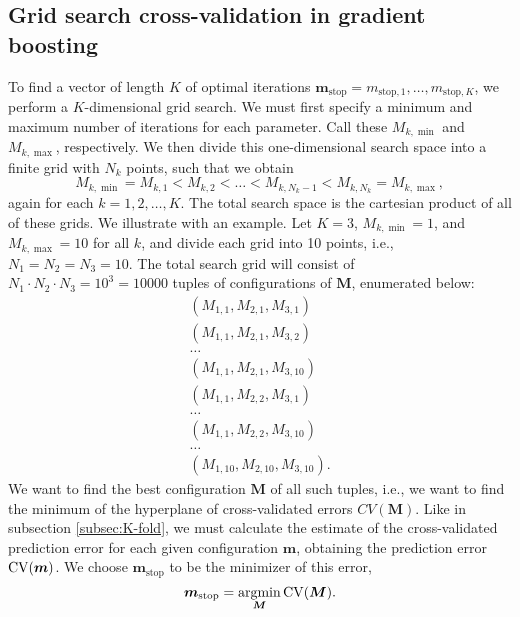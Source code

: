 \subsection{Grid search cross-validation in gradient boosting}\label{grid-search}
To find a vector of length $K$ of optimal iterations $\boldsymbol{m}_{\text{stop}}=m_{\text{stop},1},\ldots,m_{\text{stop},K}$, we perform a $K$-dimensional grid search.
We must first specify a minimum and maximum number of iterations for each parameter.
Call these $M_{k,\min}$ and $M_{k,\max}$, respectively.
We then divide this one-dimensional search space into a finite grid with $N_k$ points, such that we obtain
\begin{equation*} 
    M_{k,\min}=M_{k,1}<M_{k,2}<\ldots<M_{k,N_k-1}<M_{k,N_k}=M_{k,\max},
\end{equation*}
again for each $k=1,2,\ldots,K$.
The total search space is the cartesian product of all of these grids.
We illustrate with an example. Let $K=3$, $M_{k,\min}=1$, and $M_{k,\max}=10$ for all $k$, and divide each grid into 10 points, i.e., $N_1=N_2=N_3=10$.
The total search grid will consist of $N_1\cdot N_2\cdot N_3=10^3=10000$ tuples of configurations of $\boldsymbol{M}$, enumerated below:
\begin{align*}
    \left(M_{1,1},M_{2,1},M_{3,1}\right) \\
    \left(M_{1,1},M_{2,1},M_{3,2}\right) \\
    \ldots \\
    \left(M_{1,1},M_{2,1},M_{3,10}\right) \\
    \left(M_{1,1},M_{2,2},M_{3,1}\right) \\
    \ldots \\
    \left(M_{1,1},M_{2,2},M_{3,10}\right) \\
    \ldots \\
    \left(M_{1,10},M_{2,10},M_{3,10}\right).
\end{align*}
We want to find the best configuration $\boldsymbol{M}$ of all such tuples, i.e., we want to find the minimum of the hyperplane of cross-validated errors $CV(\boldsymbol{M})$.
Like in subsection \ref{subsec:K-fold}, we must calculate the estimate of the cross-validated prediction error for each given configuration $\boldsymbol{m}$, obtaining the prediction error $\operatorname{CV}(\boldsymbol{m})$.
We choose $\boldsymbol{m}_{\text{stop}}$ to be the minimizer of this error,
\begin{equation*}
    \boldsymbol{m}_{\text{stop}}=\operatorname*{argmin}_{\boldsymbol{M}}\operatorname{CV}(\boldsymbol{M}).
\end{equation*}

